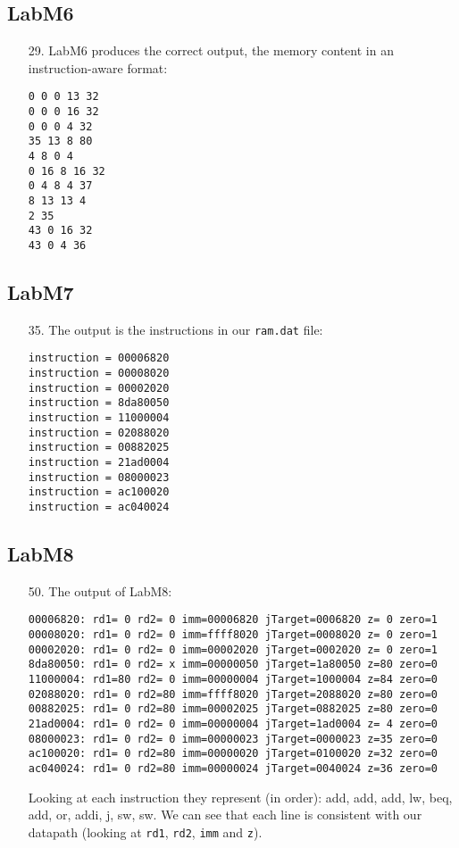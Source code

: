 \documentclass{article}
\begin{document}
\subsection{LabM6}
\begin{enumerate}
\item[29. ] LabM6 produces the correct output, the memory content in an
instruction-aware format:
\begin{verbatim}
0 0 0 13 32
0 0 0 16 32
0 0 0 4 32
35 13 8 80
4 8 0 4
0 16 8 16 32
0 4 8 4 37
8 13 13 4
2 35
43 0 16 32
43 0 4 36
\end{verbatim}
\end{enumerate}

\subsection{LabM7}
\begin{enumerate}
\item[35. ] The output is the instructions in our \verb$ram.dat$ file:
\begin{verbatim}
instruction = 00006820
instruction = 00008020
instruction = 00002020
instruction = 8da80050
instruction = 11000004
instruction = 02088020
instruction = 00882025
instruction = 21ad0004
instruction = 08000023
instruction = ac100020
instruction = ac040024
\end{verbatim}
\end{enumerate}

\subsection{LabM8}
\begin{enumerate}
\item[50. ] The output of LabM8:
\begin{verbatim}
00006820: rd1= 0 rd2= 0 imm=00006820 jTarget=0006820 z= 0 zero=1
00008020: rd1= 0 rd2= 0 imm=ffff8020 jTarget=0008020 z= 0 zero=1
00002020: rd1= 0 rd2= 0 imm=00002020 jTarget=0002020 z= 0 zero=1
8da80050: rd1= 0 rd2= x imm=00000050 jTarget=1a80050 z=80 zero=0
11000004: rd1=80 rd2= 0 imm=00000004 jTarget=1000004 z=84 zero=0
02088020: rd1= 0 rd2=80 imm=ffff8020 jTarget=2088020 z=80 zero=0
00882025: rd1= 0 rd2=80 imm=00002025 jTarget=0882025 z=80 zero=0
21ad0004: rd1= 0 rd2= 0 imm=00000004 jTarget=1ad0004 z= 4 zero=0
08000023: rd1= 0 rd2= 0 imm=00000023 jTarget=0000023 z=35 zero=0
ac100020: rd1= 0 rd2=80 imm=00000020 jTarget=0100020 z=32 zero=0
ac040024: rd1= 0 rd2=80 imm=00000024 jTarget=0040024 z=36 zero=0
\end{verbatim}
  Looking at each instruction they represent (in order): add, add, add, lw, beq,
add, or, addi, j, sw, sw. We can see that each line is consistent with our
datapath (looking at \verb$rd1$, \verb$rd2$, \verb$imm$ and \verb$z$).
\end{enumerate}
\end{document}
